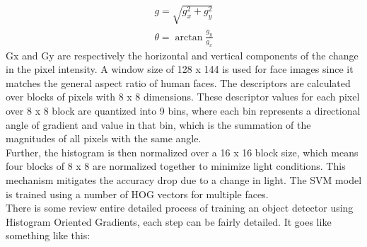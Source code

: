         \begin{align}
            g = \sqrt{g^2_x + g^2_y} \\ 
            \theta = \arctan{\frac{g_y}{g_x}}
        \end{align}
        Gx and Gy are respectively the horizontal and vertical components of the change in the pixel intensity. A window size of 128 x 144 is used for face images since it matches the general aspect ratio of human faces. 
        The descriptors are calculated over blocks of pixels with 8 x 8 dimensions. These descriptor values for each pixel over 8 x 8 block are quantized into 9 bins, where each bin represents a directional angle of gradient 
        and value in that bin, which is the summation of the magnitudes of all pixels with the same angle. \\ 
        \vspace{3mm}
        Further, the histogram is then normalized over a 16 x 16 block size, which means four blocks of 8 x 8 are normalized together to minimize light conditions. This mechanism mitigates the accuracy drop due to a 
        change in light. The SVM model is trained using a number of HOG vectors for multiple faces. \\
        \vspace{3mm}
        There is some review entire detailed process of training an object detector using Histogram Oriented Gradients, each step can be fairly detailed. It goes like something like this:
